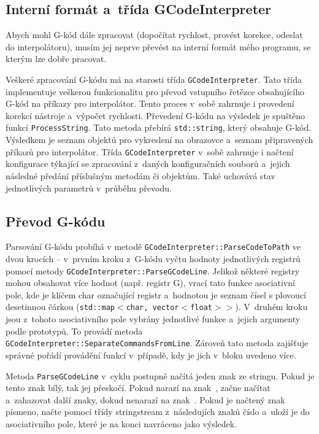 		\subsection{Interní formát a~třída GCodeInterpreter}
		Abych mohl G-kód dále zpracovat (dopočítat rychlost, provést korekce, odeslat do interpolátoru), musím jej neprve převést na interní formát mého programu, se kterým lze dobře pracovat.
		
		Veškeré zpracování G-kódu má na starosti třída {\tt GCodeInterpreter}. Tato třída implementuje veškerou funkcionalitu pro převod vstupního řetězce obsahujícího G-kód na příkazy pro interpolátor. Tento proces v~sobě zahrnuje i provedení korekcí nástroje a~výpočet rychlosti. Převedení G-kódu na výsledek je spuštěno funkcí {\tt ProcessString}. Tato metoda přebírá {\tt std::string}, který obsahuje G-kód. Výsledkem je seznam objektů pro vykreslení na obrazovce a~seznam připravených příkazů pro interpolátor. Třída {\tt GCodeInterpreter} v~sobě zahrnuje i načtení konfigurace týkající se zpracování z~daných konfiguračních souborů a~jejich následné předání příslušným metodám či objektům. Také uchovává stav jednotlivých parametrů v~průběhu převodu.
		
		\subsection{Převod G-kódu}
		Parsování G-kódu probíhá v metodě {\tt GCodeInterpreter::ParseCodeToPath} ve dvou krocích -- v~prvním kroku z~G-kódu vyčtu hodnoty jednotlivých registrů pomocí metody {\tt GCodeInterpreter::ParseGCodeLine}. Jelikož některé registry mohou obsahovat více hodnot (např. registr G), vrací tato funkce asociativní pole, kde je klíčem char označující registr a~hodnotou je seznam čísel s plovoucí desetinnou čárkou ({\tt std::map$<$char, vector$<$float$>>$}). V~druhém kroku jsou z~tohoto asociativního pole vybrány jednotlivé funkce a~jejich argumenty podle prototypů. To provádí metoda {\tt GCodeInterpreter::SeparateCommandsFromLine}. Zároveň tato metoda zajišťuje správné pořádí provádění funkcí v~případě, kdy je jich v~bloku uvedeno více.
		
		Metoda {\tt ParseGCodeLine} v~cyklu postupně načítá jeden znak ze stringu. Pokud je tento znak bílý, tak jej přeskočí. Pokud narazí na znak~\uv{{\tt (}}, začne načítat a~zahazovat další znaky, dokud nenarazí na znak~\uv{{\tt )}}. Pokud je načtený znak písmeno, načte pomocí třídy stringstream z~následujích znaků číslo a~uloží je do asociativního pole, které je na konci navráceno jako výsledek.
		
